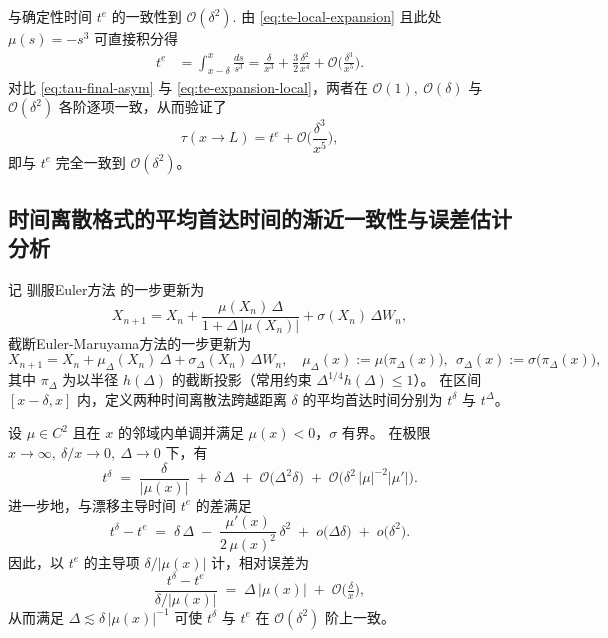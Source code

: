 与确定性时间 $t^e$ 的一致性到 $\mathcal O(\delta^{2})$. 由 \eqref{eq:te-local-expansion} 且此处 $\mu(s)=-s^{3}$ 可直接积分得
\begin{align}
	t^e&=\int_{x-\delta}^{x}\frac{ds}{s^{3}}
	=\frac{\delta}{x^{3}}+\frac{3}{2}\frac{\delta^{2}}{x^{4}}
	+\mathcal O\!\Big(\frac{\delta^{3}}{x^{5}}\Big).
	\label{eq:te-expansion-local}
\end{align}
对比 \eqref{eq:tau-final-asym} 与 \eqref{eq:te-expansion-local}，两者在
\(
\mathcal O(1),\ \mathcal O(\delta)
\)
与
\(
\mathcal O(\delta^{2})
\)
各阶逐项一致，从而验证了
\[
\tau(x\to L)=t^e+\mathcal O\!\Big(\frac{\delta^{3}}{x^{5}}\Big),
\]
即与 \(t^e\) 完全一致到 \(\mathcal O(\delta^{2})\)。




\subsection{时间离散格式的平均首达时间的渐近一致性与误差估计分析}

记 驯服Euler方法 的一步更新为
\[
X_{n+1}
=
X_n
+\frac{\mu(X_n)\,\Delta}{1+\Delta\,\lvert\mu(X_n)\rvert}
+\sigma(X_n)\,\Delta W_n,
\]
截断Euler-Maruyama方法的一步更新为
\[
X_{n+1}
=
X_n+\mu_{\Delta}(X_n)\,\Delta+\sigma_{\Delta}(X_n)\,\Delta W_n,
\quad
\mu_{\Delta}(x):=\mu\!\big(\pi_{\Delta}(x)\big),\ \ 
\sigma_{\Delta}(x):=\sigma\!\big(\pi_{\Delta}(x)\big),
\]
其中 \(\pi_{\Delta}\) 为以半径 \(h(\Delta)\) 的截断投影（常用约束 \(\Delta^{1/4}h(\Delta)\le 1\)）。
在区间 \([x-\delta,x]\) 内，定义两种时间离散法跨越距离 \(\delta\) 的平均首达时间分别为
\(t^{\delta} \) 与 \(t^{\Delta}\)。

\begin{theorem}\label{thm:tamed-mfpt}
	设 \(\mu\in C^{2}\) 且在 \(x\) 的邻域内单调并满足 \(\mu(x)<0\)，\(\sigma\) 有界。
	在极限 \(x\to\infty,\ \delta/x\to0,\ \Delta\to0\) 下，有
	\begin{equation}\label{eq:tamed-expansion}
		t^{\delta}
		\;=\;
		\frac{\delta}{\lvert \mu(x)\rvert}
		\;+\;\delta\,\Delta
		\;+\;\mathcal O\!\Big(\Delta^{2}\delta\Big)
		\;+\;\mathcal O\!\Big(\delta^{2}\,\lvert \mu\rvert^{-2}\lvert \mu'\rvert\Big).
	\end{equation}
	进一步地，与漂移主导时间 \(t^{e}\) 的差满足
	\begin{equation}\label{eq:tamed-vs-te}
		t^{\delta} -t^{e}
		\;=\;
		\delta\,\Delta
		\;-\;\frac{\mu'(x)}{2\,\mu(x)^{2}}\,\delta^{2}
		\;+\;o\!\Big(\Delta\delta\Big)
		\;+\;o\!\Big(\delta^{2}\Big).
	\end{equation}
	因此，以 \(t^{e}\) 的主导项 \(\delta/\lvert\mu(x)\rvert\) 计，相对误差为
	\[
	\frac{t^{\delta}-t^{e}}{\delta/\lvert\mu(x)\rvert}
	\;=\;
	\Delta\,\lvert\mu(x)\rvert
	\;+\;\mathcal O\!\Big(\tfrac{\delta}{x}\Big),
	\]
	从而满足
	\(
	\Delta\lesssim \delta\,\lvert\mu(x)\rvert^{-1}
	\)
	可使 \(t^{\delta}\) 与 \(t^{e}\) 在 \(\mathcal O(\delta^{2})\) 阶上一致。
\end{theorem}

